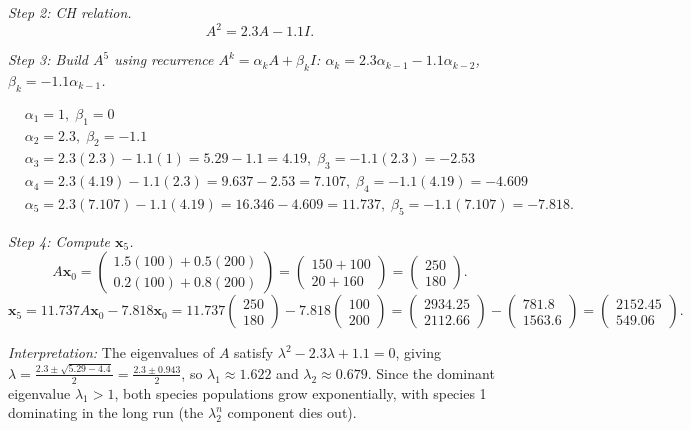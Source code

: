 \documentclass[12pt,a4paper]{article}
\begin{document}
\textit{Step 2: CH relation.}
\[
  A^2 = 2.3A - 1.1I.
\]

\textit{Step 3: Build \(A^5\) using recurrence \(A^k = \alpha_k A + \beta_k I\):
\(\alpha_k = 2.3\alpha_{k-1} - 1.1\alpha_{k-2}\), \(\beta_k = -1.1\alpha_{k-1}\).}

\begin{align*}
  &\alpha_1 = 1,\; \beta_1 = 0 \\
  &\alpha_2 = 2.3,\; \beta_2 = -1.1 \\
  &\alpha_3 = 2.3(2.3) - 1.1(1) = 5.29 - 1.1 = 4.19,\; \beta_3 = -1.1(2.3) = -2.53 \\
  &\alpha_4 = 2.3(4.19) - 1.1(2.3) = 9.637 - 2.53 = 7.107,\; \beta_4 = -1.1(4.19) = -4.609 \\
  &\alpha_5 = 2.3(7.107) - 1.1(4.19) = 16.346 - 4.609 = 11.737,\; \beta_5 = -1.1(7.107) = -7.818.
\end{align*}

\textit{Step 4: Compute \(\mathbf{x}_5\).}
\[
  A\mathbf{x}_0 = \begin{pmatrix}1.5(100)+0.5(200)\\0.2(100)+0.8(200)\end{pmatrix}
  = \begin{pmatrix}150+100\\20+160\end{pmatrix} = \begin{pmatrix}250\\180\end{pmatrix}.
\]
\[
  \mathbf{x}_5 = 11.737 A\mathbf{x}_0 - 7.818\mathbf{x}_0
  = 11.737\begin{pmatrix}250\\180\end{pmatrix} - 7.818\begin{pmatrix}100\\200\end{pmatrix}
  = \begin{pmatrix}2934.25\\2112.66\end{pmatrix} - \begin{pmatrix}781.8\\1563.6\end{pmatrix}
  = \begin{pmatrix}2152.45\\549.06\end{pmatrix}.
\]

\textit{Interpretation:} The eigenvalues of \(A\) satisfy \(\lambda^2 - 2.3\lambda + 1.1 = 0\), giving \(\lambda = \frac{2.3 \pm \sqrt{5.29-4.4}}{2} = \frac{2.3 \pm 0.943}{2}\), so \(\lambda_1 \approx 1.622\) and \(\lambda_2 \approx 0.679\). Since the dominant eigenvalue \(\lambda_1 > 1\), both species populations grow exponentially, with species 1 dominating in the long run (the \(\lambda_2^n\) component dies out).
\end{document}
